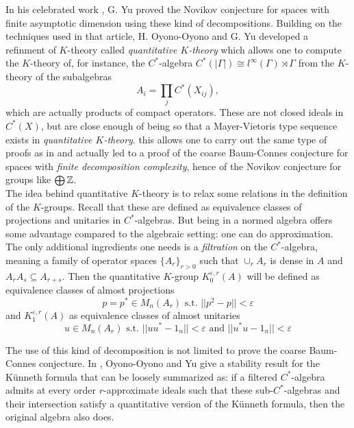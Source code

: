 In his celebrated work \cite{Yu1}, G. Yu proved the Novikov conjecture for spaces with finite asymptotic dimension using these kind of decompositions. Building on the techniques used in that article, H. Oyono-Oyono and G. Yu developed a refinment of $K$-theory called \textit{quantitative $K$-theory} which allows one to compute the $K$-theory of, for instance, the $C^*$-algebra $C^*(|\Gamma|) \cong l^\infty(\Gamma)\rtimes \Gamma$ from the $K$-theory of the subalgebras 
\[A_i = \prod_{j} C^*(X_{ij}),\]
which are actually products of compact operators. These are not closed ideals in $C^*(X)$, but are close enough of being so that a Mayer-Vietoris type sequence exists in \textit{quantitative $K$-theory}. this allows one to carry out the same type of proofs as in \cite{Yu1} and actually led to a proof of the coarse Baum-Connes conjecture for spaces with \textit{finite decomposition complexity}, hence of the Novikov conjecture for groups like $\bigoplus \mathbb{Z}$.  \\

The idea behind quantitative $K$-theory is to relax some relations in the definition of the $K$-groups. Recall that these are defined as equivalence classes of projections and unitaries in $C^*$-algebras. But being in a normed algebra offers some advantage compared to the algebraic setting: one can do approximation. The only additional ingredients one needs is a \textit{filtration} on the $C^*$-algebra, meaning a family of operator spaces $\{A_r\}_{r>0}$ such that $\cup_r A_r$ is dense in $A$ and $A_r A_s \subseteq A_{r+s}$. Then the quantitative $K$-group $K_0^{\varepsilon,r}(A)$ will be defined as equivalence classes of almost projections 
\[p=p^*\in M_n(A_r) \text{ s.t. } ||p^2 - p || <\varepsilon  \] 	 
and $K_1^{\varepsilon,r}(A)$ as equivalence classes of almost unitaries
\[u\in M_n(A_r) \text{ s.t. } ||uu^* - 1_n || <\varepsilon  \text{ and }  ||u^*u - 1_n || <\varepsilon \]

The use of this kind of decomposition is not limited to prove the coarse Baum-Connes conjecture. In \cite{OY4}, Oyono-Oyono and Yu give a stability result for the K\"unneth formula that can be loosely summarized as: if a filtered $C^*$-algebra admits at every order $r$-approximate ideals such that these sub-$C^*$-algebras and their intersection satisfy a quantitative version of the K\"unneth formula, then the original algebra also does.\\
  

